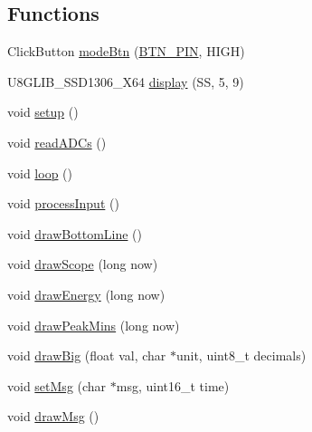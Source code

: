 \subsection*{Functions}
\begin{DoxyCompactItemize}
\item 
Click\+Button \hyperlink{_u_s_b___tester___o_l_e_d__128x64___beta__2_82_8ino_af30cb44456f6a6654151fdb4a713cda7}{mode\+Btn} (\hyperlink{_u_s_b___tester___o_l_e_d__128x64___beta__2_82_8ino_a19943d19def2dd315b897e30477e005f}{B\+T\+N\+\_\+\+P\+IN}, H\+I\+GH)
\item 
U8\+G\+L\+I\+B\+\_\+\+S\+S\+D1306\+\_\+X64 \hyperlink{_u_s_b___tester___o_l_e_d__128x64___beta__2_82_8ino_ad7b6178a94a364b52e324e100b0311de}{display} (SS, 5, 9)
\item 
void \hyperlink{_u_s_b___tester___o_l_e_d__128x64___beta__2_82_8ino_a4fc01d736fe50cf5b977f755b675f11d}{setup} ()
\item 
void \hyperlink{_u_s_b___tester___o_l_e_d__128x64___beta__2_82_8ino_a47aaf718ce1182a7225ad5f0123a99a2}{read\+A\+D\+Cs} ()
\item 
void \hyperlink{_u_s_b___tester___o_l_e_d__128x64___beta__2_82_8ino_afe461d27b9c48d5921c00d521181f12f}{loop} ()
\item 
void \hyperlink{_u_s_b___tester___o_l_e_d__128x64___beta__2_82_8ino_aab154b082dd58cba1ed43eb82adcf168}{process\+Input} ()
\item 
void \hyperlink{_u_s_b___tester___o_l_e_d__128x64___beta__2_82_8ino_ab5d455e2661c48053af78b45d7eb902e}{draw\+Bottom\+Line} ()
\item 
void \hyperlink{_u_s_b___tester___o_l_e_d__128x64___beta__2_82_8ino_a9da71451af567b7d8a6459535dc861ec}{draw\+Scope} (long now)
\item 
void \hyperlink{_u_s_b___tester___o_l_e_d__128x64___beta__2_82_8ino_ace2fc5703ebe53f1c62d8b9b208b7ca7}{draw\+Energy} (long now)
\item 
void \hyperlink{_u_s_b___tester___o_l_e_d__128x64___beta__2_82_8ino_a5fdf539ee41d555f473ca2760a17000c}{draw\+Peak\+Mins} (long now)
\item 
void \hyperlink{_u_s_b___tester___o_l_e_d__128x64___beta__2_82_8ino_a79cde0d3a9ea19ce3f89ec6d0760849e}{draw\+Big} (float val, char $\ast$unit, uint8\+\_\+t decimals)
\item 
void \hyperlink{_u_s_b___tester___o_l_e_d__128x64___beta__2_82_8ino_a0387211b0ea0866fc96dfcf7bd3ba0bd}{set\+Msg} (char $\ast$msg, uint16\+\_\+t time)
\item 
void \hyperlink{_u_s_b___tester___o_l_e_d__128x64___beta__2_82_8ino_af73b5b00706aac69454641a634e19343}{draw\+Msg} ()

\end{DoxyCompactItemize}
